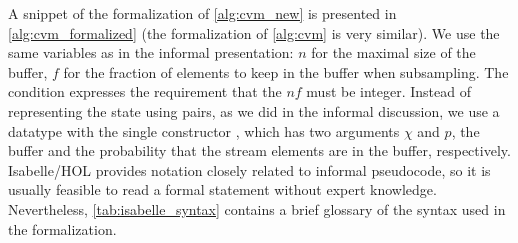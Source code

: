 A snippet of the formalization of \cref{alg:cvm_new} is presented in \cref{alg:cvm_formalized} (the formalization of \cref{alg:cvm} is very similar).
We use the same variables as in the informal presentation: $n$ for the maximal size of the buffer, $f$ for the fraction of elements to keep in the buffer when subsampling.
The condition  expresses the requirement that the $nf$ must be integer.
Instead of representing the state using pairs, as we did in the informal discussion, we use a datatype with the single constructor , which has two arguments $\chi$ and $p$, the buffer and the probability that the stream elements are in the buffer, respectively.
Isabelle/HOL provides notation closely related to informal pseudocode, so it is usually feasible to read a formal statement without expert knowledge.
Nevertheless, \cref{tab:isabelle_syntax} contains a brief glossary of the syntax used in the formalization.
